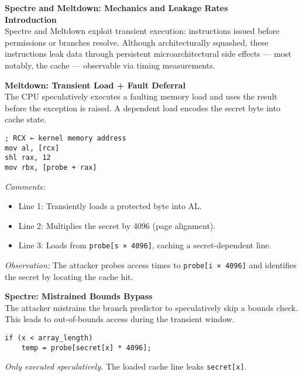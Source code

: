 \begin{technical}
{\Large\textbf{Spectre and Meltdown: Mechanics and Leakage Rates}}\\[0.7em]

\textbf{Introduction}\\[0.5em]
Spectre and Meltdown exploit transient execution: instructions issued before permissions or branches resolve. Although architecturally squashed, these instructions leak data through persistent microarchitectural side effects — most notably, the cache — observable via timing measurements.

\vspace{0.4em}
\textbf{Meltdown: Transient Load + Fault Deferral}\\[0.5em]
The CPU speculatively executes a faulting memory load and uses the result before the exception is raised. A dependent load encodes the secret byte into cache state.

\begin{verbatim}
; RCX ← kernel memory address
mov al, [rcx]
shl rax, 12
mov rbx, [probe + rax]
\end{verbatim}
\vspace{-0.5em}
\textit{Comments:}
\begin{itemize}[noitemsep,topsep=0pt]
\item Line 1: Transiently loads a protected byte into AL.
\item Line 2: Multiplies the secret by 4096 (page alignment).
\item Line 3: Loads from \texttt{probe[s × 4096]}, caching a secret-dependent line.
\end{itemize}

\textit{Observation:} The attacker probes access times to \texttt{probe[i × 4096]} and identifies the secret by locating the cache hit.

\vspace{0.4em}
\textbf{Spectre: Mistrained Bounds Bypass}\\[0.5em]
The attacker mistrains the branch predictor to speculatively skip a bounds check. This leads to out-of-bounds access during the transient window.

\begin{verbatim}
if (x < array_length)
    temp = probe[secret[x] * 4096];
\end{verbatim}
\vspace{-0.5em}
\textit{Only executed speculatively.} The loaded cache line leaks \texttt{secret[x]}.


\end{technical}
